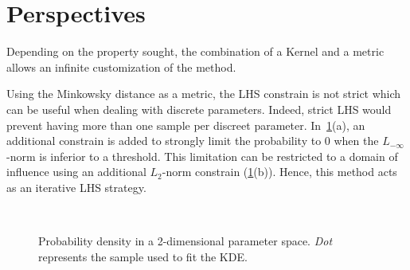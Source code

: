 \section{Perspectives}

Depending on the property sought, the combination of a Kernel and a metric allows an infinite customization of the method.

Using the Minkowsky distance as a metric, the LHS constrain is not strict which can be useful when dealing with discrete parameters. Indeed, strict LHS would prevent having more than one sample per discreet parameter. In~\cref{fig:lhs_const}(a), an additional constrain is added to strongly limit the probability to 0 when the $L_{-\infty}$-norm is inferior to a threshold. This limitation can be restricted to a domain of influence using an additional $L_2$-norm constrain (\cref{fig:lhs_const}(b)). Hence, this method acts as an iterative LHS strategy.

\begin{figure}[!h]               
\centering
{}
~

\caption{Probability density in a 2-dimensional parameter space. \emph{Dot} represents the sample used to fit the KDE.}
 \label{fig:lhs_const}
\end{figure}

